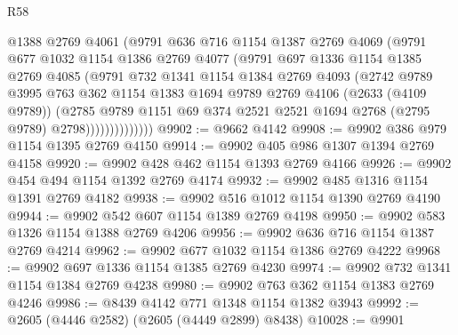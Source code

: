 \begin{lexlean}{R58}
\begin{coremodule}
                    @1388
                    @2769
                    @4061
                    (@9791
                      @636
                      @716
                      @1154
                      @1387
                      @2769
                      @4069
                      (@9791
                        @677
                        @1032
                        @1154
                        @1386
                        @2769
                        @4077
                        (@9791
                          @697
                          @1336
                          @1154
                          @1385
                          @2769
                          @4085
                          (@9791
                            @732
                            @1341
                            @1154
                            @1384
                            @2769
                            @4093
                            (@2742
                              @9789
                              @3995
                              @763
                              @362
                              @1154
                              @1383
                              @1694
                              @9789
                              @2769
                              @4106
                              (@2633 (@4109 @9789))
                              (@2785
                                @9789
                                @1151
                                @69
                                @374
                                @2521
                                @2521
                                @1694
                                @2768
                                (@2795 @9789)
                                @2798))))))))))))))
@9902 := @9662 @4142
@9908 := @9902 @386 @979 @1154 @1395 @2769 @4150
@9914 := @9902 @405 @986 @1307 @1394 @2769 @4158
@9920 := @9902 @428 @462 @1154 @1393 @2769 @4166
@9926 := @9902 @454 @494 @1154 @1392 @2769 @4174
@9932 := @9902 @485 @1316 @1154 @1391 @2769 @4182
@9938 := @9902 @516 @1012 @1154 @1390 @2769 @4190
@9944 := @9902 @542 @607 @1154 @1389 @2769 @4198
@9950 := @9902 @583 @1326 @1154 @1388 @2769 @4206
@9956 := @9902 @636 @716 @1154 @1387 @2769 @4214
@9962 := @9902 @677 @1032 @1154 @1386 @2769 @4222
@9968 := @9902 @697 @1336 @1154 @1385 @2769 @4230
@9974 := @9902 @732 @1341 @1154 @1384 @2769 @4238
@9980 := @9902 @763 @362 @1154 @1383 @2769 @4246
@9986 := @8439 @4142 @771 @1348 @1154 @1382 @3943
@9992 := @2605 (@4446 @2582) (@2605 (@4449 @2899) @8438)
@10028 := @9901

\end{coremodule}
\end{lexlean}
